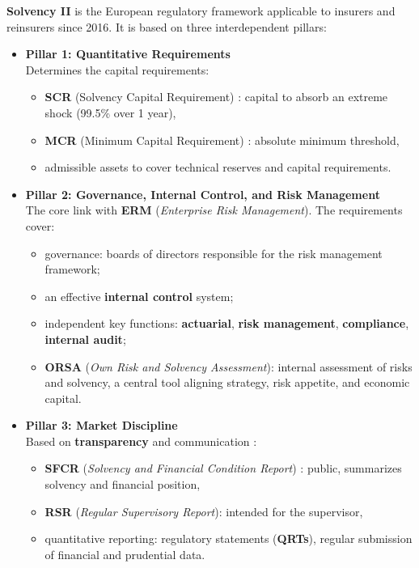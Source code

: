 	
\begin{f}
	
	\textbf{Solvency II} is the European regulatory framework applicable to insurers and reinsurers since 2016. It is based on three interdependent pillars:
	
	\begin{itemize}
		\item \textbf{Pillar 1: Quantitative Requirements} \\
		Determines the capital requirements:
		\begin{itemize}
			\item \textbf{SCR} (Solvency Capital Requirement) : capital to absorb an extreme shock (99.5\% over 1 year),
			\item \textbf{MCR} (Minimum Capital Requirement) : absolute minimum threshold,
			\item admissible assets to cover technical reserves and capital requirements.
		\end{itemize}
		
		\item \textbf{Pillar 2: Governance, Internal Control, and Risk Management} \\
		The core link with \textbf{ERM} (\emph{Enterprise Risk Management}). The requirements cover:
		\begin{itemize}
			\item governance: boards of directors responsible for the risk management framework;
			\item an effective \textbf{internal control} system;
			\item independent key functions: \textbf{actuarial}, \textbf{risk management}, \textbf{compliance}, \textbf{internal audit};
			\item \textbf{ORSA} (\emph{Own Risk and Solvency Assessment}): internal assessment of risks and solvency, a central tool aligning strategy, risk appetite, and economic capital.
		\end{itemize}
		
		\item \textbf{Pillar 3: Market Discipline} \\
		Based on \textbf{transparency} and communication :
		\begin{itemize}
			\item \textbf{SFCR} (\emph{Solvency and Financial Condition Report}) : public, summarizes solvency and financial position,
			\item \textbf{RSR} (\emph{Regular Supervisory Report}): intended for the supervisor,
			\item quantitative reporting: regulatory statements (\textbf{QRTs}), regular submission of financial and prudential data.
		\end{itemize}
	\end{itemize}
		
\end{f}
